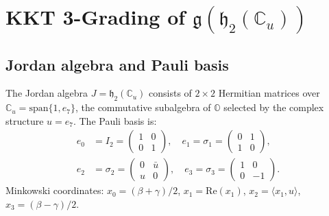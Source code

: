 
%

\section{KKT 3-Grading of $\mathfrak{g}(\mathfrak{h}_2(\mathbb{C}_u))$}

\subsection{Jordan algebra and Pauli basis}

The Jordan algebra $J = \mathfrak{h}_2(\mathbb{C}_u)$ consists of $2 \times 2$
Hermitian matrices over $\mathbb{C}_u = \mathrm{span}\{1, e_7\}$, the
commutative subalgebra of $\mathbb{O}$ selected by the complex structure
$u = e_7$. The Pauli basis is:
\begin{align}
  e_0 &= I_2 = \begin{pmatrix} 1 & 0 \\ 0 & 1 \end{pmatrix}, \quad
  e_1 = \sigma_1 = \begin{pmatrix} 0 & 1 \\ 1 & 0 \end{pmatrix}, \\
  e_2 &= \sigma_2 = \begin{pmatrix} 0 & \bar{u} \\ u & 0 \end{pmatrix}, \quad
  e_3 = \sigma_3 = \begin{pmatrix} 1 & 0 \\ 0 & -1 \end{pmatrix}.
\end{align}
Minkowski coordinates: $x_0 = (\beta+\gamma)/2$, $x_1 = \mathrm{Re}(x_1)$,
$x_2 = \langle x_1, u \rangle$, $x_3 = (\beta-\gamma)/2$.

